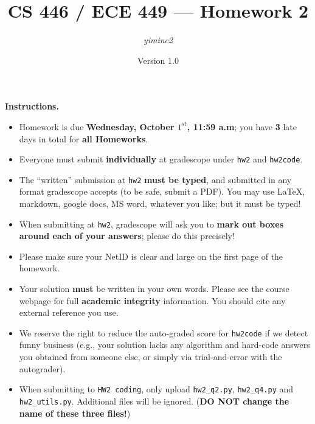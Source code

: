 \documentclass{article}
\title{CS 446 / ECE 449 --- Homework 2}
\author{\emph{yiminc2}}
\date{Version 1.0}
\theoremstyle{definition}
\theoremstyle{remark}
\begin{document}
\maketitle

\noindent\textbf{Instructions.}
\begin{itemize}
	\item
	      Homework is due \textbf{Wednesday, October $1^{st}$, 11:59 a.m}; you have \textbf{3} late days in total for \textbf{all Homeworks}.

	\item
	      Everyone must submit \textbf{individually} at gradescope under \texttt{hw2} and \texttt{hw2code}.

	\item
	      The ``written'' submission at \texttt{hw2} \textbf{must be typed}, and submitted in
	      any format gradescope accepts (to be safe, submit a PDF).  You may use \LaTeX, markdown,
	      google docs, MS word, whatever you like; but it must be typed!

	\item
	      When submitting at \texttt{hw2}, gradescope will ask you to \textbf{mark out boxes
		      around each of your answers}; please do this precisely!

	\item
	      Please make sure your NetID is clear and large on the first page of the homework.

	\item
	      Your solution \textbf{must} be written in your own words.
	      Please see the course webpage for full \textbf{academic integrity} information.
	      You should cite any external reference you use.

	\item
	      We reserve the right to reduce the auto-graded score for
	      \texttt{hw2code} if we detect funny business (e.g., your solution
	      lacks any algorithm and hard-code answers you obtained from
	      someone else, or simply via trial-and-error with the autograder).

	\item
	      When submitting to \texttt{HW2 coding}, only upload \texttt{hw2\_q2.py}, \texttt{hw2\_q4.py} and \texttt{hw2\_utils.py}. Additional files will be ignored. (\textbf{DO NOT change the name of these three files!})

\end{itemize}
\end{document}
